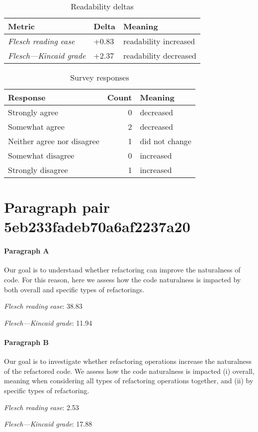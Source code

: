 \bigskip\begin{table}[!h]
\centering
\begin{tabular}{lll}
\toprule
               \textbf{Metric} & \textbf{Delta} &       \textbf{Meaning} \\
\midrule
    \emph{Flesch reading ease} &          +0.83 &  readability increased \\
 \emph{Flesch---Kincaid grade} &          +2.37 &  readability decreased \\
\bottomrule
\end{tabular}
\caption*{Readability deltas}\end{table}

\begin{table}[!h]
\centering
\begin{tabular}{lrl}
\toprule
          \textbf{Response} &  \textbf{Count} & \textbf{Meaning} \\
\midrule
             Strongly agree &               0 &        decreased \\
             Somewhat agree &               2 &        decreased \\
 Neither agree nor disagree &               1 &   did not change \\
          Somewhat disagree &               0 &        increased \\
          Strongly disagree &               1 &        increased \\
\bottomrule
\end{tabular}
\caption*{Survey responses}\end{table}


\newpage
\section{Paragraph pair 5eb233fadeb70a6af2237a20}
\paragraph{Paragraph A}
Our goal is to understand whether refactoring can improve the naturalness of code. For this reason, here we assess how the code naturalness is impacted by both overall and specific types of refactorings.\par\medskip
\emph{Flesch reading ease}: 38.83\par
\emph{Flesch---Kincaid grade}: 11.94

\paragraph{Paragraph B}
Our goal is to investigate whether refactoring operations increase the naturalness of the refactored code. We assess how the code naturalness is impacted (i) overall, meaning when considering all types of refactoring operations together, and (ii) by specific types of refactoring.\par\medskip
\emph{Flesch reading ease}: 2.53\par
\emph{Flesch---Kincaid grade}: 17.88

